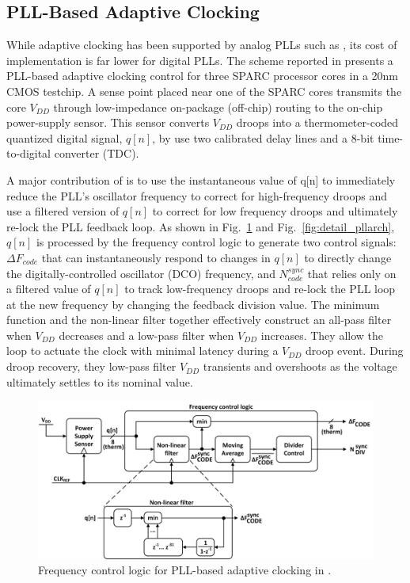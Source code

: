\documentclass[twoside,9pt,journal,letterpage]{IEEEtran}
\begin{document}
\subsection{PLL-Based Adaptive Clocking}
\label{sec:details_pll}
While adaptive clocking has been supported by analog PLLs such as \cite{kurd2009next}, its cost of implementation is far lower for digital PLLs. The scheme reported in \cite{hashimoto2018} presents a PLL-based adaptive clocking control for three SPARC processor cores in a 20nm CMOS testchip. A sense point placed near one of the SPARC cores transmits the core $V_{DD}$ through low-impedance on-package (off-chip) routing to the on-chip power-supply sensor. This sensor converts $V_{DD}$ droops into a thermometer-coded quantized digital signal, $q[n]$, by use two calibrated delay lines and a 8-bit time-to-digital converter (TDC). 

A major contribution of \cite{hashimoto2018} is to use the instantaneous value of q[n] to immediately reduce the PLL's oscillator frequency to correct for high-frequency droops and use a filtered version of $q[n]$ to correct for low frequency droops and ultimately re-lock the PLL feedback loop. As shown in Fig.\ \ref{fig:detail_pll} and Fig.\ \ref{fig:detail_pllarch}, $q[n]$ is processed by the frequency control logic to generate two control signals: $\Delta F_{code}$ that can instantaneously respond to changes in $q[n]$ to directly change the digitally-controlled oscillator (DCO) frequency, and $N^{sync}_{code}$ that relies only on a filtered value of $q[n]$ to track low-frequency droops and re-lock the PLL loop at the new frequency by changing the feedback division value. The minimum function and the non-linear filter together effectively construct an all-pass filter when $V_{DD}$ decreases and a low-pass filter when $V_{DD}$ increases. They allow the loop to actuate the clock with minimal latency during a $V_{DD}$ droop event. During droop recovery, they low-pass filter $V_{DD}$ transients and overshoots as the voltage ultimately settles to its nominal value.

\begin{figure}[h]
	\centering
	\includegraphics[width=\columnwidth]{fig_detail_pll}
	\caption{Frequency control logic for PLL-based adaptive clocking in \cite{hashimoto2018}.}
	\label{fig:detail_pll}
\end{figure}
\end{document}
